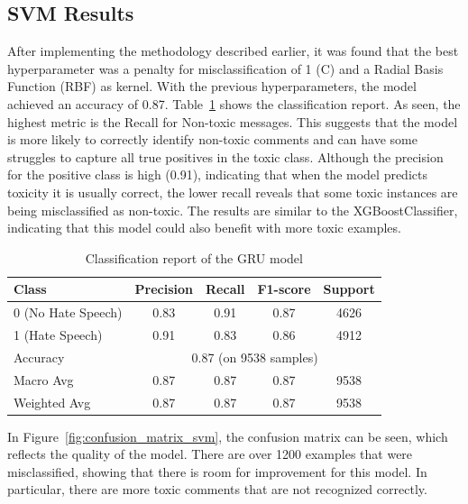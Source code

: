 \subsection{SVM Results}
After implementing the methodology described earlier, it was found that the best hyperparameter was a penalty for misclassification of 1 (C) and a Radial Basis Function (RBF) as kernel. With the previous hyperparameters, the model achieved an accuracy of 0.87. 
Table~\ref{tab:gru_classification_report} shows the classification report. As seen, the highest metric is the Recall for Non-toxic messages. This suggests that the model is more likely to correctly identify non-toxic comments and can have some struggles to capture all true positives in the toxic class. Although the precision for the positive class is high (0.91), indicating that when the model predicts toxicity it is usually correct, the lower recall reveals that some toxic instances are being misclassified as non-toxic. The results are similar to the XGBoostClassifier, indicating that this model could also benefit with more toxic examples.

\begin{table}[H]
    \centering
    \caption{Classification report of the GRU model}
    \label{tab:gru_classification_report}
    \begin{tabular}{lcccc}
        \toprule
        Class & Precision & Recall & F1-score & Support \\
        \midrule
        0 (No Hate Speech) & 0.83 & 0.91 & 0.87 & 4626 \\
        1 (Hate Speech)    & 0.91 & 0.83 & 0.86 & 4912 \\
        \midrule
        Accuracy           & \multicolumn{4}{c}{0.87 (on 9538 samples)} \\
        Macro Avg          & 0.87 & 0.87 & 0.87 & 9538 \\
        Weighted Avg       & 0.87 & 0.87 & 0.87 & 9538 \\
        \bottomrule
    \end{tabular}
\end{table}

In Figure~\ref{fig:confusion_matrix_svm}, the confusion matrix can be seen, which reflects the quality of the model. There are over 1200 examples that were misclassified, showing that there is room for improvement for this model. In particular, there are more toxic comments that are not recognized correctly.

